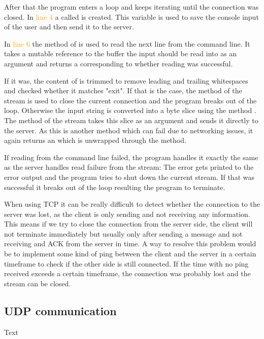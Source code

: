 After that the program enters a loop and keeps iterating until the connection was closed. In \textcolor{orange}{line 4}
a  called  is created. This variable is used to save the console input of the user and then send
it to the server.

In \textcolor{orange}{line 6} the method  of  is used to read the next
line from the command line. It takes a mutable reference to the buffer the input should be read into as an argument and
returns a  corresponding to whether reading was successful.

If it was, the content of  is trimmed to remove leading and trailing whitespaces and checked whether it
matches "exit". If that is the case, the  method of the stream is used to close the current connection
and the program breaks out of the loop. Otherwise the input string is converted into a byte slice using
the  method . The method  of the stream takes this slice as an argument and
sends it directly to the server. As this is another method which can fail due to networking issues, it again returns an
 which is unwrapped through the  method.

If reading from the command line failed, the program handles it exactly the same as the server handles read failure
from the stream: The error gets printed to the error output and the program tries to shut down the current stream. If
that was successful it breaks out of the loop resulting the program to terminate.

When using TCP it can be really difficult to detect whether the connection to the server was lost, as the client is
only sending and not receiving any information. This means if we try to close the connection from the server side, the
client will not terminate immediately but usually only after sending a message and not receiving and ACK from the
server in time. A way to resolve this problem would be to implement some kind of ping between the client and the server
in a certain timeframe to check if the other side is still connected. If the time with no ping received exceeds a
certain timeframe, the connection was probably lost and the stream can be closed.

\subsection{UDP communication}
Text
